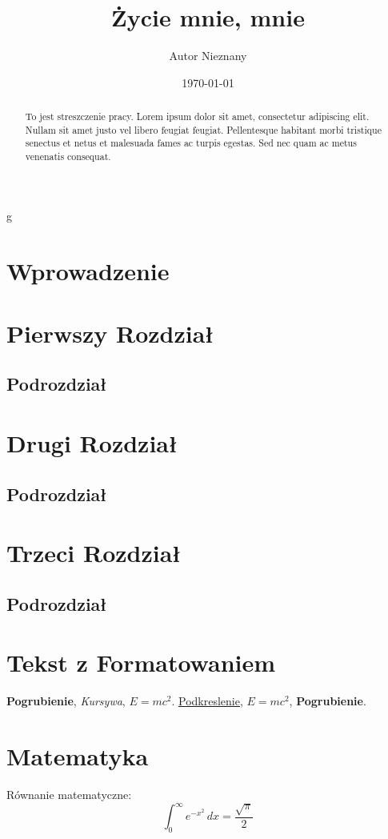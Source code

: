 g\documentclass{article}
\title{Życie mnie, mnie}
\author{Autor Nieznany}
\date{\today}
\begin{document}
\maketitle

\begin{abstract}
    To jest streszczenie pracy. Lorem ipsum dolor sit amet, consectetur adipiscing elit. Nullam sit amet justo vel libero feugiat feugiat. Pellentesque habitant morbi tristique senectus et netus et malesuada fames ac turpis egestas. Sed nec quam ac metus venenatis consequat.
\end{abstract}

\tableofcontents

\section{Wprowadzenie}
\lipsum[1]

\section{Pierwszy Rozdział}
\subsection{Podrozdział}
\lipsum[2-4]

\section{Drugi Rozdział}
\subsection{Podrozdział}
\lipsum[5-7]

\section{Trzeci Rozdział}
\subsection{Podrozdział}
\lipsum[8-15]

\section{Tekst z Formatowaniem}
\textbf{Pogrubienie}, \emph{Kursywa}, $E=mc^2$.
\underline{Podkreslenie}, $E=mc^2$, \textbf{Pogrubienie}.

\section{Matematyka}
Równanie matematyczne:
\begin{equation}
    \int_{0}^{\infty} e^{-x^2} \, dx = \frac{\sqrt{\pi}}{2}
\end{equation}
\end{document}

